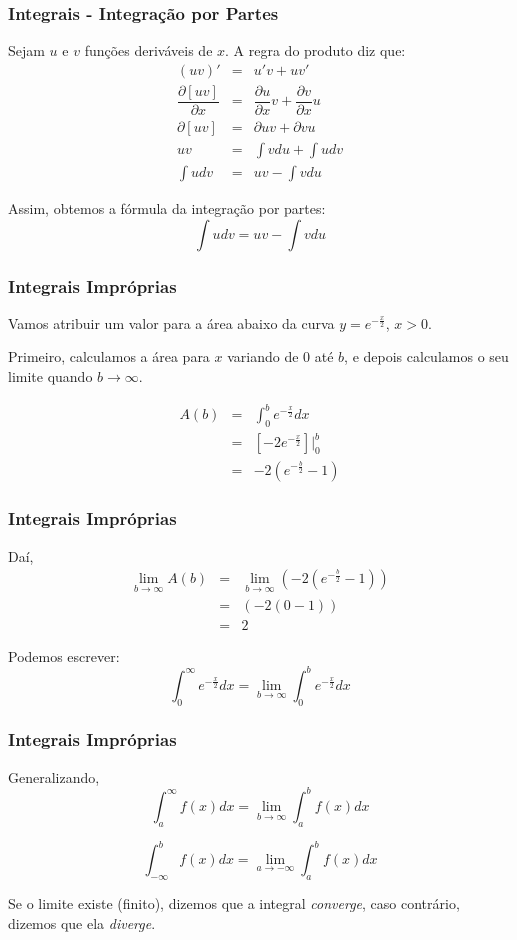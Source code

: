 \documentclass[hyperref={pdfpagelabels=false}]{beamer}
\begin{document}
\begin{frame}
\frametitle{Integrais - Integração por Partes}
Sejam $u$ e $v$ funções deriváveis de $x$. A regra do produto diz que:
\begin{eqnarray*}
(uv)' & = & u'v + uv' \\
\dfrac{\partial [uv]}{\partial x} & = & \dfrac{\partial u}{\partial x}v + \dfrac{\partial v}{\partial x}u \\
\partial[uv] & = & \partial u v + \partial v u \\
uv & = & \int v du + \int u dv \\
\int u dv & = & uv - \int v du
\end{eqnarray*} \pause

Assim, obtemos a fórmula da integração por partes:
$$\int u dv = uv - \int v du$$


\end{frame}


\begin{frame}
\frametitle{Integrais Impróprias}
Vamos atribuir um valor para a área abaixo da curva $y = e^{-\frac{x}{2}}$, $x>0$.
\pause

Primeiro, calculamos a área para $x$ variando de $0$ até $b$, e depois calculamos o seu limite quando $b \rightarrow \infty$.

\begin{eqnarray*}
A(b) & = & \int_{0}^{b}e^{-\frac{x}{2}}dx \\
& = & [-2e^{-\frac{x}{2}}]|_{0}^{b} \\
& = & -2(e^{-\frac{b}{2}}-1) 
\end{eqnarray*}


\end{frame}


\begin{frame}
\frametitle{Integrais Impróprias}

Daí,
\begin{eqnarray*}
\lim\limits_{b \rightarrow \infty}A(b) & = & \lim\limits_{b \rightarrow \infty}(-2(e^{-\frac{b}{2}}-1)) \\
& = & (-2 (0-1)) \\
& = & 2
\end{eqnarray*}
\pause

Podemos escrever:
$$\int_{0}^{\infty}e^{-\frac{x}{2}}dx = \lim\limits_{b \rightarrow \infty}\int_{0}^{b}e^{-\frac{x}{2}}dx$$

\end{frame}


\begin{frame}
\frametitle{Integrais Impróprias}

Generalizando,
$$\int_{a}^{\infty}f(x)dx = \lim\limits_{b \rightarrow \infty}\int_{a}^{b}f(x)dx$$

$$\int_{-\infty}^{b}f(x)dx = \lim\limits_{a \rightarrow - \infty}\int_{a}^{b}f(x)dx$$

Se o limite existe (finito), dizemos que a integral \emph{converge}, caso contrário, dizemos que ela \emph{diverge}.

\end{frame}
\end{document}
